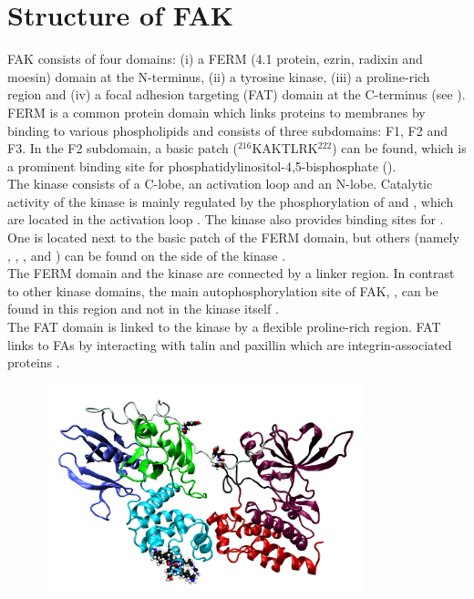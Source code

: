 \section{Structure of FAK}
FAK consists of four domains: (i) a FERM (4.1 protein, ezrin, radixin and moesin) domain at the N-terminus, (ii) a tyrosine kinase, (iii) a proline-rich region and (iv) a focal adhesion targeting (FAT) domain at the C-terminus (see ).\\
FERM is a common protein domain which links proteins to membranes by binding to various phospholipids \autocite{fermdomain} and consists of three subdomains: F1, F2 and F3. In the F2 subdomain, a basic patch ($^{216}$KAKTLRK$^{222}$) can be found, which is a prominent binding site for phosphatidylinositol-4,5-bisphosphate (\pip).\\
The kinase consists of a C-lobe, an activation loop and an N-lobe. Catalytic activity of the kinase is mainly regulated by the phosphorylation of  and , which are located in the activation loop \autocite{tyrosinePhosphor}. The kinase also provides binding sites for \pip{}. One is located next to the basic patch of the FERM domain, but others (namely , , ,  and ) can be found on the side of the kinase \autocites{pap002}{pap002Exp}.\\
The FERM domain and the kinase are connected by a linker region. In contrast to other kinase domains, the main autophosphorylation site of FAK, , can be found in this region and not in the kinase itself \autocite{pap001}.\\
The FAT domain is linked to the kinase by a flexible proline-rich region. FAT links to FAs by interacting with talin and paxillin which are integrin-associated proteins \autocite{fatdomain}.
%
%
%
\begin{figure}
	\centering
	\includegraphics[height=6cm]{figures/introduction/fak}
	\label{intro:fak}
\end{figure}
%
%
%
